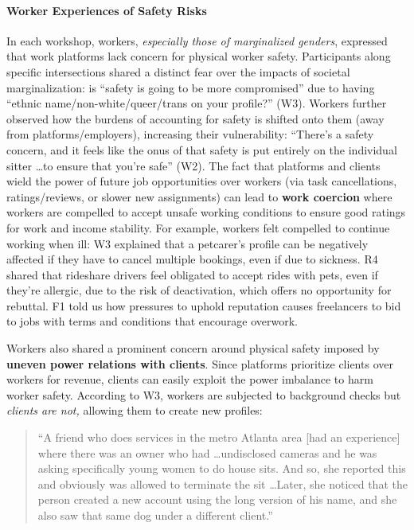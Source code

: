 \paragraph{{Worker Experiences of Safety Risks}} In each workshop, workers, \textit{especially those of marginalized genders}, expressed that work platforms lack concern for {physical} worker safety. Participants along specific intersections shared a distinct fear over the impacts of societal marginalization: is ``safety is going to be more compromised'' due to having ``ethnic name/non-white/queer/trans on your profile?'' (W3). {Workers further} observed {how the burdens of accounting for safety is shifted onto them (away from platforms/employers)}, increasing their vulnerability: ``There's a safety concern, and it feels like the onus of that safety is put entirely on the individual sitter  \dots  to ensure that you're safe'' (W2). 
{The fact that platforms and clients wield the power of future job opportunities over workers (via task cancellations, ratings/reviews, or slower new assignments)} can lead to \textbf{work coercion} where workers are compelled to accept unsafe working conditions to ensure good ratings for work and income stability. For example, workers felt compelled to continue working when ill: W3 explained that a petcarer's profile can be negatively affected if they have to cancel multiple bookings, even if due to sickness. R4 shared that rideshare drivers feel obligated to accept rides with pets, even if they're allergic, due to the risk of deactivation, which offers no opportunity for rebuttal. F1 told us how pressures to uphold reputation causes freelancers to bid to jobs with terms and conditions that encourage overwork.

Workers also shared a prominent concern around physical safety imposed by \textbf{{uneven power relations with} clients}. Since platforms prioritize clients over workers for revenue, clients can easily exploit the power imbalance to harm worker safety. 
According to W3, workers are subjected to background checks but \emph{clients are not,} allowing them to create new profiles:

\begin{quote}

``A friend who does services in the metro Atlanta area [had an experience] where there was an owner who had \dots undisclosed cameras and he was asking specifically young women to do house sits. And so, she reported this and obviously was allowed to terminate the sit \dots Later, she noticed that the person created a new account using the long version of his name, and she also saw that same dog under a different client.'' 
    
\end{quote}

